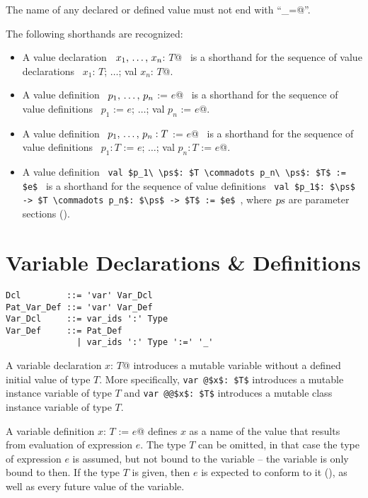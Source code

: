 The name of any declared or defined value must not end with ``\lstinline@_=@''. 

The following shorthands are recognized: 
\begin{itemize}
\item[]
A value declaration ~\lstinline@val $x_1 ,\, \ldots ,\, x_n$: $T$@~ is a shorthand for the sequence of value declarations ~\lstinline@val $x_1$: $T$; $\ldots$; val $x_n$: $T$@. 

\item[]
A value definition ~\lstinline@val $p_1 ,\, \ldots ,\, p_n$ := $e$@~ is a shorthand for the sequence of value definitions ~\lstinline@val $p_1$ := $e$; $\ldots$; val $p_n$ := $e$@. 

\item[]
A value definition ~\lstinline@val $p_1 ,\, \ldots ,\, p_n: T$ := $e$@~ is a shorthand for the sequence of value definitions ~\lstinline@val $p_1: T$ := $e$; $\ldots$; val $p_n: T$ := $e$@.

\item[]
A value definition ~\lstinline!val $p_1\ \ps$: $T \commadots p_n\ \ps$: $T$ := $e$!~ is a shorthand for the sequence of value definitions ~\lstinline!val $p_1$: $\ps$ -> $T \commadots p_n$: $\ps$ -> $T$ := $e$!~, where $\mbox{\sl ps}$ are parameter sections ().
\end{itemize}






\section{Variable Declarations \& Definitions}
\label{sec:variable-dcl-def}

\syntax\begin{lstlisting}
Dcl         ::= 'var' Var_Dcl
Pat_Var_Def ::= 'var' Var_Def
Var_Dcl     ::= var_ids ':' Type
Var_Def     ::= Pat_Def
              | var_ids ':' Type ':=' '_'
\end{lstlisting}

A variable declaration \lstinline@var $x$: $T$@ introduces a mutable variable without a defined initial value of type $T$. More specifically, \lstinline+var @$x$: $T$+ introduces a mutable instance variable of type $T$ and \lstinline+var @@$x$: $T$+ introduces a mutable class instance variable of type $T$. 

A variable definition \lstinline@var $x$: $T$ := $e$@ defines $x$ as a name of the value that results from evaluation of expression $e$. The type $T$ can be omitted, in that case the type of expression $e$ is assumed, but not bound to the variable -- the variable is only bound to  then. If the type $T$ is given, then $e$ is expected to conform to it (), as well as every future value of the variable. 

